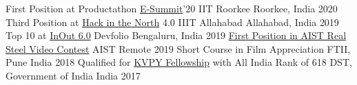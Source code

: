 \begin{cvhonors}
  \cvhonor
    {First Position at Productathon \href{https://www.esummit.in/}{E-Summit}'20}
    {IIT Roorkee}
    {Roorkee, India}
    {2020}
  \cvhonor
	{Third Position at \href{https://www.hackinthenorth.com/}{Hack in the North} 4.0}
	{IIIT Allahabad}
	{Allahabad, India}
	{2019}
  \cvhonor
    {Top 10 at \href{https://inout2019.devfolio.co/}{InOut 6.0}}
    {Devfolio}
    {Bengaluru, India}
    {2019}
  \cvhonor
    {\href{https://www.aist.org/AIST/aist/AIST/About\%20AIST/PDFs/Release_2019_RealSteel_Video_Contest_Winners_FINAL.pdf}{First Position in AIST Real Steel Video Contest}}
    {AIST}
    {Remote}
    {2019}
  \cvhonor
  	{Short Course in Film Appreciation}
	{FTII, Pune}
	{India}
	{2018}
  \cvhonor
    {Qualified for \href{http://www.kvpy.iisc.ernet.in/main/index.htm}{KVPY Fellowship} with All India Rank of 618}
    {DST, Government of India}
    {India}
    {2017}

\end{cvhonors}

